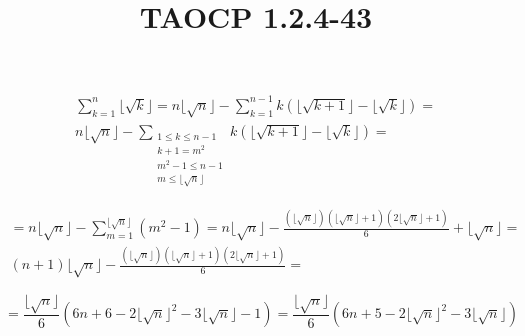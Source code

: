 \documentclass{article}
\title{TAOCP 1.2.4\mbox{-}43}
\begin{document}
\maketitle

\begin{multline*}
\sum_{k=1}^{n} \lfloor \sqrt k \rfloor = n \lfloor \sqrt n \rfloor - \sum_{k=1}^{n-1} k(\lfloor \sqrt {k+1} \rfloor - \lfloor \sqrt k \rfloor) = \\
n \lfloor \sqrt n \rfloor - \sum_{\substack{1 \leq k \leq n - 1\\k+1=m^{2}\\ m^{2} - 1 \leq n - 1 \\ m \leq \lfloor \sqrt{n} \rfloor }} k(\lfloor \sqrt {k+1} \rfloor - \lfloor \sqrt k \rfloor) =
\end{multline*}

\begin{multline*}
= n \lfloor \sqrt n \rfloor - \sum_{m=1}^{\lfloor \sqrt n \rfloor} (m^{2}-1) = n \lfloor \sqrt n \rfloor - \frac{(\lfloor \sqrt n \rfloor)(\lfloor \sqrt n \rfloor + 1)(2\lfloor \sqrt n \rfloor + 1)}{6} + \lfloor \sqrt n \rfloor = \\
(n+1)\lfloor \sqrt n \rfloor - \frac{(\lfloor \sqrt n \rfloor)(\lfloor \sqrt n \rfloor + 1)(2\lfloor \sqrt n \rfloor + 1)}{6} =
\end{multline*}

\[ = \frac{\lfloor \sqrt n \rfloor}{6} (6n+6 - 2\lfloor \sqrt n \rfloor^{2} - 3 \lfloor \sqrt n \rfloor - 1) = \frac{\lfloor \sqrt n \rfloor}{6} (6n+5 - 2\lfloor \sqrt n \rfloor^{2} - 3 \lfloor \sqrt n \rfloor) \]
\end{document}
